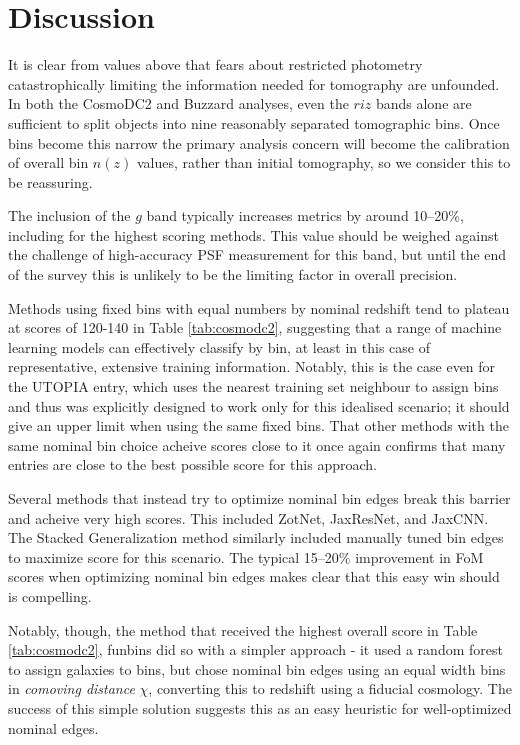 \documentclass[twocolumn,twocolappendix]{aastex63}
\begin{document}
\section{Discussion}
It is clear from values above that fears about restricted photometry catastrophically limiting
the information needed for tomography are unfounded.  In both the CosmoDC2 and Buzzard analyses,
even the $riz$ bands alone are sufficient to split objects into nine reasonably separated
tomographic bins.  Once bins become this narrow the primary analysis concern will become the calibration of overall
bin $n(z)$ values, rather than initial tomography, so we consider this to be reassuring.

The inclusion of the $g$ band typically increases metrics by around 10--20\%, including for the
highest scoring methods.  This value should be weighed against the challenge of high-accuracy
PSF measurement for this band, but until the end of the survey this is unlikely to be
the limiting factor in overall precision.

Methods using fixed bins with equal numbers by nominal redshift tend to plateau at scores of
120-140 in Table \ref{tab:cosmodc2}, suggesting that a range of machine learning models can
effectively classify by bin, at least in this case of representative, extensive training
information.  Notably, this is the case even for the UTOPIA entry, which uses the nearest 
training set neighbour to assign bins and thus was explicitly designed to work only
for this idealised scenario; it should give an upper limit when using the same fixed bins.
That other methods with the same nominal bin choice acheive scores close to it once again
confirms that many entries are close to the best possible score for this approach.

Several methods that instead try to optimize nominal bin edges break this
barrier and acheive very high scores.  This included ZotNet, JaxResNet, and JaxCNN.  The
Stacked Generalization method similarly included manually tuned bin edges to maximize
score for this scenario. The typical 15--20\% improvement in FoM scores when optimizing
nominal bin edges makes clear that this easy win should is compelling.

Notably, though, the method that received the highest overall score in Table \ref{tab:cosmodc2}, 
{\sc funbins} did so with a simpler approach - it used a random forest to assign galaxies to bins,
but chose nominal bin edges using an equal width bins in \emph{comoving distance} $\chi$, converting
this to redshift using a fiducial cosmology. The success of this simple solution suggests this
as an easy heuristic for well-optimized nominal edges.
\end{document}
